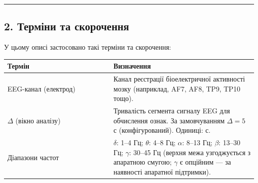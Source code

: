 \documentclass[12pt,a4paper]{article}
\begin{document}
\begin{center}\rule{0.5\linewidth}{0.5pt}\end{center}



\subsection{2. Терміни та скорочення}\label{ux442ux435ux440ux43cux456ux43dux438-ux442ux430-ux441ux43aux43eux440ux43eux447ux435ux43dux43dux44f}



У цьому описі застосовано такі терміни та скорочення:



{\def\LTcaptype{none} %

\begin{longtable}[]{@{}

  >{\raggedright\arraybackslash}p{0.4211\linewidth}

  >{\raggedright\arraybackslash}p{0.5789\linewidth}@{}}

\toprule\noalign{}

\begin{minipage}[b]{\linewidth}\raggedright

Термін

\end{minipage} & \begin{minipage}[b]{\linewidth}\raggedright

Визначення

\end{minipage} \\

\midrule\noalign{}

\endhead

\bottomrule\noalign{}

\endlastfoot

EEG-канал (електрод) & Канал реєстрації біоелектричної активності мозку (наприклад, AF7, AF8, TP9, TP10 тощо). \\

\(\Delta\) (вікно аналізу) & Тривалість сегмента сигналу EEG для обчислення ознак. За замовчуванням \(\Delta = 5\) с (конфігурований). Одиниці: с. \\

Діапазони частот & \(\delta\): 1--4 Гц; \(\theta\): 4--8 Гц; \(\alpha\): 8--13 Гц; \(\beta\): 13--30 Гц; \(\gamma\): 30--45 Гц (верхня межа узгоджується з апаратною смугою; \(\gamma\) є опційним --- за наявності апаратної підтримки). \\


\end{longtable}}
\end{document}
